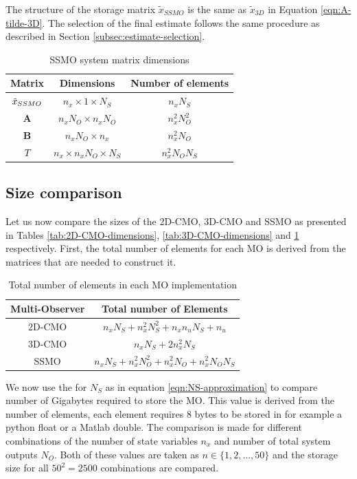 The structure of the storage matrix $\tilde{x}_{SSMO}$ is the same as $\tilde{x}_{3D}$ in Equation \eqref{eqn:A-tilde-3D}. The selection of the final estimate follows the same procedure as described in Section \ref{subsec:estimate-selection}.

\begin{table}[H]
    \centering
    \begin{tabular}{|c|c|c|}
        \toprule
       Matrix  & Dimensions & Number of elements \\ \midrule
       $\Tilde{x}_{SSMO}$  & $ n_x \times 1 \times N_S$ & $n_xN_S$ \\
       $\mathbf{A}$ & $n_xN_O \times n_xN_O$ & $n_x^2N_O^2$ \\ 
       $\mathbf{B}$ & $n_xN_O \times n_x$ & $n_x^2N_O$ \\
       $T$ & $n_x \times n_xN_O \times N_S$ & $n_x^2N_ON_S$ \\
       \bottomrule
    \end{tabular}
    \caption{SSMO system matrix dimensions}
    \label{tab:SSMO-dimensions}
\end{table}

\subsection{Size comparison}\label{subsec:size-comparison}
Let us now compare the sizes of the 2D-CMO, 3D-CMO and SSMO as presented in Tables \ref{tab:2D-CMO-dimensions}, \ref{tab:3D-CMO-dimensions} and \ref{tab:SSMO-dimensions} respectively. First, the total number of elements for each MO is derived from the matrices that are needed to construct it. 
\begin{table}[ht]
    \centering
    \begin{tabular}{|c|c|}
        \toprule
        Multi-Observer & Total number of Elements \\
        \midrule
        2D-CMO & $n_xN_S + n_x^2N_S^2 + n_xn_uN_S + n_u$ \\
        3D-CMO & $n_xN_S + 2n_x^2N_S$ \\
        SSMO   & $n_xN_S + n_x^2N_O^2 + n_x^2N_O + n_x^2N_ON_S$ \\
        \bottomrule
    \end{tabular}
    \caption{Total number of elements in each MO implementation}
    \label{tab:all-sizes}
\end{table}

We now use the for $N_S$ as in equation \eqref{eqn:NS-approximation} to compare number of Gigabytes required to store the MO. This value is derived from the number of elements, each element requires 8 bytes to be stored in for example a python float or a Matlab double. The comparison is made for different combinations of the number of state variables $n_x$ and number of total system outputs $N_O$. Both of these values are taken as $n \in \{1,2,\dots,50\}$ and the storage size for all $50^2=2500$ combinations are compared.

